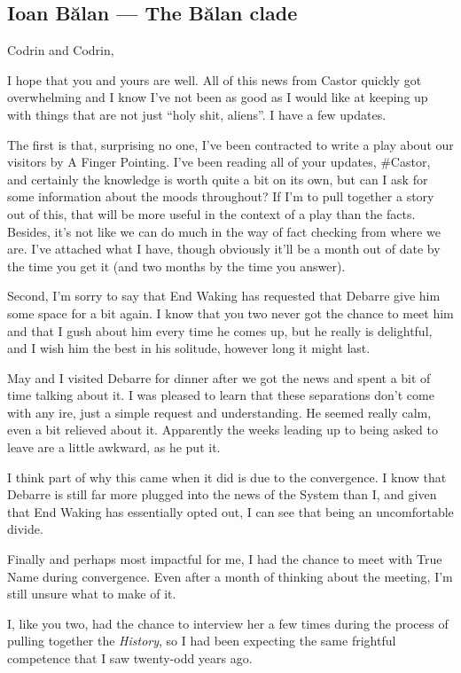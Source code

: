 \hypertarget{ioan-bux103lan-the-bux103lan-clade}{%
\subsection{Ioan Bălan — The Bălan clade}\label{ioan-bux103lan-the-bux103lan-clade}}

Codrin and Codrin,

I hope that you and yours are well. All of this news from Castor quickly got overwhelming and I know I've not been as good as I would like at keeping up with things that are not just ``holy shit, aliens''. I have a few updates.

The first is that, surprising no one, I've been contracted to write a play about our visitors by A Finger Pointing. I've been reading all of your updates, \#Castor, and certainly the knowledge is worth quite a bit on its own, but can I ask for some information about the moods throughout? If I'm to pull together a story out of this, that will be more useful in the context of a play than the facts. Besides, it's not like we can do much in the way of fact checking from where we are. I've attached what I have, though obviously it'll be a month out of date by the time you get it (and two months by the time you answer).

Second, I'm sorry to say that End Waking has requested that Debarre give him some space for a bit again. I know that you two never got the chance to meet him and that I gush about him every time he comes up, but he really is delightful, and I wish him the best in his solitude, however long it might last.

May and I visited Debarre for dinner after we got the news and spent a bit of time talking about it. I was pleased to learn that these separations don't come with any ire, just a simple request and understanding. He seemed really calm, even a bit relieved about it. Apparently the weeks leading up to being asked to leave are a little awkward, as he put it.

I think part of why this came when it did is due to the convergence. I know that Debarre is still far more plugged into the news of the System than I, and given that End Waking has essentially opted out, I can see that being an uncomfortable divide.

Finally and perhaps most impactful for me, I had the chance to meet with True Name during convergence. Even after a month of thinking about the meeting, I'm still unsure what to make of it.

I, like you two, had the chance to interview her a few times during the process of pulling together the \emph{History}, so I had been expecting the same frightful competence that I saw twenty-odd years ago.

